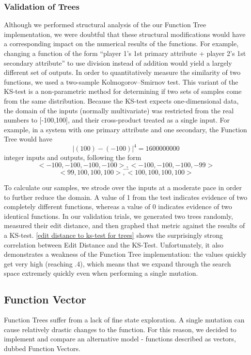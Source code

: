 \documentclass{acm_proc_article-sp}
\begin{document}
    \subsubsection{Validation of Trees}
    
Although we performed structural analysis of the our Function Tree implementation, we were doubtful that these structural modifications would have a corresponding impact on the numerical results of the functions. For example, changing a function of the form “player 1’s 1st primary attribute + player 2’s 1st secondary attribute” to use division instead of addition would yield a largely different set of outputs. In order to quantitatively measure the similarity of two functions, we used a two-sample Kolmogorov–Smirnov test. This variant of the KS-test is a non-parametric method for determining if two sets of samples come from the same distribution. 
Because the KS-test expects one-dimensional data, the domain of the inputs (normally multivariate) was restricted from the real numbers to [-100,100], and their cross-product treated as a single input. For example, in a system with one primary attribute and one secondary, the Function Tree would have $$|(100) - (-100)|^4 = 1600000000$$ integer inputs and outputs, following the form $$<-100, -100, -100, -100> , <-100, -100, -100, -99>$$
$$ ... $$
$$<99, 100, 100, 100> , <100, 100, 100, 100>$$ 

To calculate our samples, we strode over the inputs at a moderate pace in order to further reduce the domain. A value of 1 from the test indicates evidence of two completely different functions, whereas a value of 0 indicates evidence of two identical functions.
In our validation trials, we generated two trees randomly, measured their edit distance, and then graphed that metric against the results of a KS-test. \ref{edit distance to ks-test for trees} shows the surprisingly strong correlation between Edit Distance and the KS-Test. Unfortunately, it also demonstrates a weakness of the Function Tree implementation: the values quickly get very high (reaching .4), which means that we expand through the search space extremely quickly even when performing a single mutation.

	\subsection{Function Vector}
    
Function Trees suffer from a lack of fine state exploration. A single mutation can cause relatively drastic changes to the function. For this reason, we decided to implement and compare an alternative model - functions described as vectors, dubbed Function Vectors.
\end{document}
